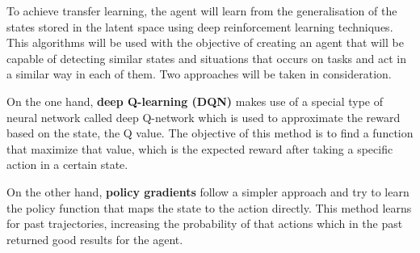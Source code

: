 To achieve transfer learning, the agent will learn from the generalisation of the states stored in the latent space using deep reinforcement learning techniques. This algorithms will be used with the objective of creating an agent that will be capable of detecting similar states and situations that occurs on tasks and act in a similar way in each of them. Two approaches will be taken in consideration.

On the one hand, \textbf{deep Q-learning (DQN)} makes use of a special type of neural network called deep Q-network which is used to approximate the reward based on the state, the Q value. The objective of this method is to find a function that maximize that value, which is the expected reward after taking a specific action in a certain  state.  


On the other hand, \textbf{policy gradients} follow a simpler approach and try to learn the policy function that maps the state to the action directly. This method learns for past trajectories, increasing the probability of that actions which in the past returned good results for the agent.





